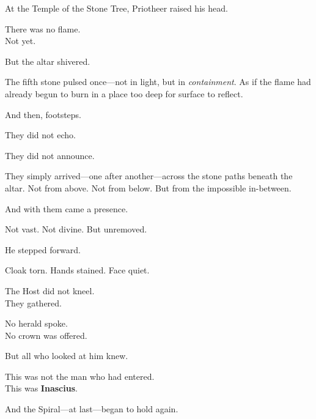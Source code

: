 \documentclass[12pt]{article}
\begin{document}
\vspace{0.5em}
At the Temple of the Stone Tree, Priotheer raised his head.

\vspace{0.5em}
There was no flame.\\
Not yet.

\vspace{0.5em}
But the altar shivered.

\vspace{0.5em}
The fifth stone pulsed once---not in light, but in \textit{containment}. As if the flame had already begun to burn in a place too deep for surface to reflect.

\vspace{0.5em}
And then, footsteps.

\vspace{0.5em}
They did not echo.

\vspace{0.5em}
They did not announce.

\vspace{0.5em}
They simply arrived---one after another---across the stone paths beneath the altar. Not from above. Not from below. But from the impossible in-between.

\vspace{0.5em}
And with them came a presence.

\vspace{0.5em}
Not vast. Not divine. But unremoved.

\vspace{0.5em}
He stepped forward.

\vspace{0.5em}
Cloak torn. Hands stained. Face quiet.

\vspace{0.5em}
The Host did not kneel.\\
They gathered.

\vspace{0.5em}
No herald spoke.\\
No crown was offered.

\vspace{0.5em}
But all who looked at him knew.

\vspace{0.5em}
This was not the man who had entered.\\
This was \textbf{Inascius}.

\vspace{0.5em}
And the Spiral---at last---began to hold again.
\end{document}
